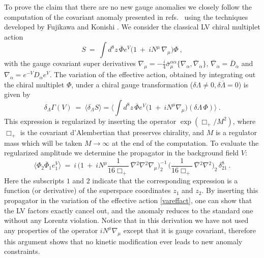 \documentclass[12pt]{revtex4}
\begin{document}
To prove the claim that there are no new gauge anomalies we 
closely follow the computation of the covariant anomaly presented in 
refs.\ \cite{Hayashi:1998ca,Gates:2000gu} using the techniques
developed by Fujikawa and Konishi
\cite{Fujikawa:1983bg,Konishi:1985tu}. We consider the classical LV
chiral multiplet action  
%
\begin{equation}
S ~=~ \int d^8z\, \overline{\Phi} 
e^V \Big(1 ~+~ i N^\mu\, \nabla_\mu  \Big) \Phi~, 
\end{equation}
%
with the gauge covariant super derivatives 
$\nabla_\mu = - \frac i4 \bar\sigma^{\alpha\dot\alpha}_\mu 
\{ \nabla_\alpha, \overline{\nabla}_{\dot\alpha} \}$, 
$\overline{\nabla}_{\dot\alpha} = \overline{D}_{\dot\alpha}$ and 
$ \nabla_\alpha = e^{-V}D_\alpha e^V$. The variation of the effective
action, obtained by integrating out the chiral multiplet $\Phi$, under a
chiral gauge transformation 
($\delta \Lambda \neq 0, \delta \overline{\Lambda} = 0$)
is given by 
%
\begin{equation}
\delta_\Lambda\Gamma(V) ~=~ 
\langle \delta_\Lambda S \rangle = 
\Big\langle \int d^8z\,  \overline{\Phi} 
e^V \Big(1 ~+~ i N^\mu \nabla_\mu  \Big) (\delta \Lambda\, \Phi)
\Big\rangle~.
\label{vareffact}
\end{equation} 
%
This expression is regularized by inserting the operator 
$\exp (\Box_+/M^2)$, where $\Box_+$ is the covariant d'Alembertian that
preserves chirality, and $M$ is a regulator mass which will be taken
$M \rightarrow \infty$ at the end of the computation. To
evaluate the regularized amplitude we determine the propagator in the
background field $V$: 
%
\begin{equation}
\langle \Phi_2 \overline{\Phi}_1 e^V_1 \rangle ~=~ 
i\,  \Big(   
1 ~+~ i N^\mu \frac 1{16 \Box_+}\,  \overline{\nabla}{}^2 \nabla{}^2
\nabla_\mu
\Big)^{-1}_2 \, 
\Big( 
\frac 1{16 \Box_+} \, \overline{\nabla}{}^2 \nabla{}^2
\Big)_2 \, \delta^8_{21}~.
\end{equation}
%
Here the subscripts $1$ and $2$ indicate that the corresponding
expression is a function (or derivative) of the superspace coordinates
$z_1$ and $z_2$. By inserting this propagator in the variation of the
effective action \eqref{vareffact}, one can show that the LV
factors exactly cancel out, and the anomaly reduces to the standard
one without any Lorentz violation. Notice that in this derivation we
have not used any properties of the operator $i N^\mu \nabla_\mu$
except that it is gauge covariant, therefore this argument 
shows that no kinetic modification ever leads to new anomaly
constraints. 
\end{document}

